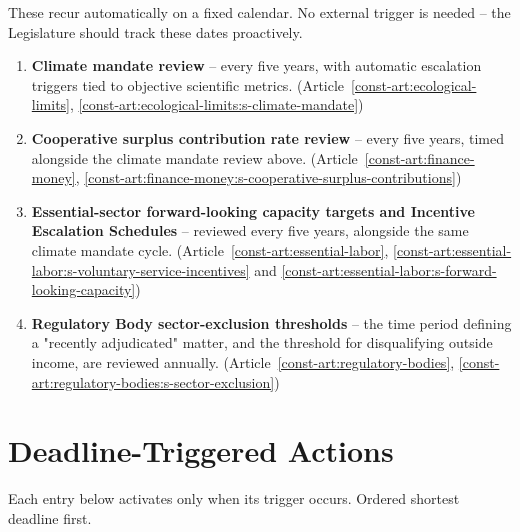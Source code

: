 \documentclass[11pt]{article}
\begin{document}
These recur automatically on a fixed calendar. No external trigger is needed -- the Legislature should track these dates proactively.

\begin{enumerate}
  \item \textbf{Climate mandate review} -- every five years, with automatic escalation triggers tied to objective scientific metrics. (Article~\ref{const-art:ecological-limits}, \ref{const-art:ecological-limits:s-climate-mandate})
  \item \textbf{Cooperative surplus contribution rate review} -- every five years, timed alongside the climate mandate review above. (Article~\ref{const-art:finance-money}, \ref{const-art:finance-money:s-cooperative-surplus-contributions})
  \item \textbf{Essential-sector forward-looking capacity targets and Incentive Escalation Schedules} -- reviewed every five years, alongside the same climate mandate cycle. (Article~\ref{const-art:essential-labor}, \ref{const-art:essential-labor:s-voluntary-service-incentives} and \ref{const-art:essential-labor:s-forward-looking-capacity})
  \item \textbf{Regulatory Body sector-exclusion thresholds} -- the time period defining a "recently adjudicated" matter, and the threshold for disqualifying outside income, are reviewed annually. (Article~\ref{const-art:regulatory-bodies}, \ref{const-art:regulatory-bodies:s-sector-exclusion})
\end{enumerate}

\section{Deadline-Triggered Actions}

Each entry below activates only when its trigger occurs. Ordered shortest deadline first.
\end{document}
